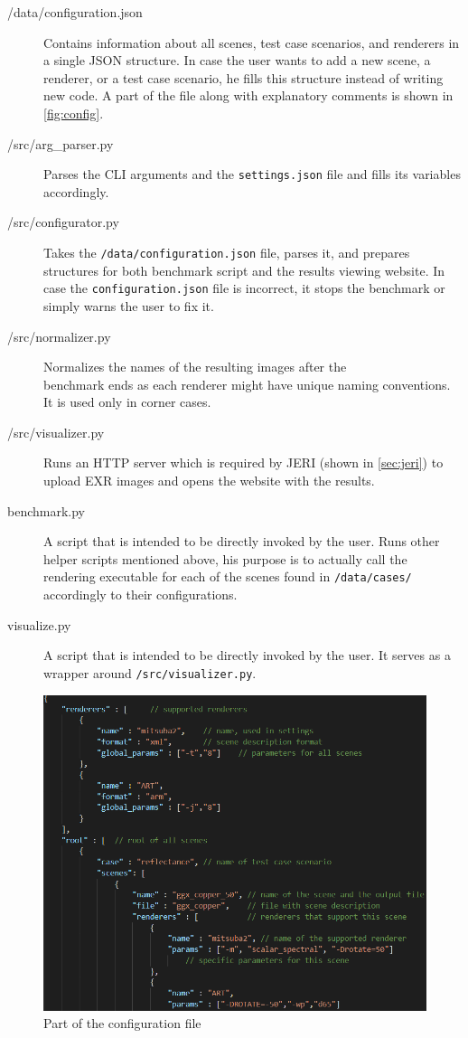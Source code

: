 \begin{description}
	\item[{/data/configuration.json}] Contains information about all scenes, test case scenarios, and renderers in a single JSON structure. In case the user wants to add a new scene, a renderer, or a test case scenario, he fills this structure instead of writing new code. A part of the file along with explanatory comments is shown in \autoref{fig:config}.
	\item[/src/arg\_parser.py] Parses the CLI arguments and the \texttt{settings.json} file and fills its variables accordingly.
	\item[/src/configurator.py] Takes the \texttt{/data/configuration.json} file, parses it, and prepares structures for both benchmark script and the results viewing website. In case the \texttt{configuration.json} file is incorrect, it stops the benchmark or simply warns the user to fix it.
	\item[/src/normalizer.py] Normalizes the names of the resulting images after the \\benchmark ends as each renderer might have unique naming conventions. It is used only in corner cases.
	\item[/src/visualizer.py] Runs an HTTP server which is required by JERI (shown in \autoref{sec:jeri}) to upload EXR images and opens the website with the results.
	\item[benchmark.py] A script that is intended to be directly invoked by the user. Runs other helper scripts mentioned above, his purpose is to actually call the rendering executable for each of the scenes found in \texttt{/data/cases/} accordingly to their configurations.
	\item[visualize.py] A script that is intended to be directly invoked by the user. It serves as a wrapper around \texttt{/src/visualizer.py}.
\end{description}

\begin{figure}
	\centering
	\includegraphics[width=\linewidth]{img/config.png}
	\caption{Part of the configuration file}
	\label{fig:config}
\end{figure}

